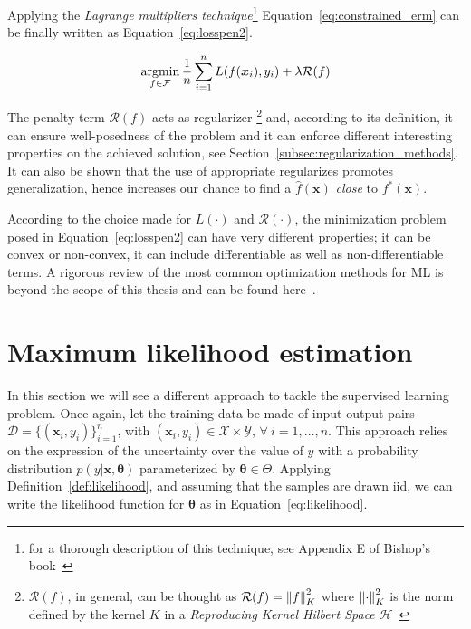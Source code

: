 Applying the \textit{Lagrange multipliers technique}\footnote{for a thorough description of this technique, see Appendix E of Bishop's book~\cite{bishop2006pattern}} Equation~\eqref{eq:constrained_erm} can be finally written as Equation~\eqref{eq:losspen2}.

\begin{equation} \label{eq:losspen2}
	\mathop{\mathrm{argmin}}\limits_{f \in \mathcal{F}}{\frac{1}{n} \sum_{i=1}^{n} L(f(\bm{x}_i), y_i)} + \lambda \mathcal{R}(f)
\end{equation}

The penalty term $\mathcal{R}(f)$ acts as regularizer \footnote{$\mathcal{R}(f)$, in general, can be thought as $\mathcal{R}(f) = \left\lVert f\right\rVert^2_K$ where $\left\lVert\cdot\right\rVert^2_K$ is the norm defined by the kernel $K$ in a \textit{Reproducing Kernel Hilbert Space} $\mathcal{H}$~\cite{evgeniou2000regularization}}
and, according to its definition, it can ensure well-posedness of the problem and it can enforce different interesting properties on the achieved solution, see Section~\ref{subsec:regularization_methods}. It can also be shown that the use of appropriate regularizes promotes generalization, hence increases our chance to find a $\hat f(\bm{x})$ \textit{close} to $f^*(\bm{x})$.

 According to the choice made for $L(\cdot)$ and $\mathcal{R}(\cdot)$, the minimization problem posed in Equation~\eqref{eq:losspen2} can have very different properties; it can be convex or non-convex, it can include differentiable as well as non-differentiable terms. A rigorous review of the most common optimization methods for ML is beyond the scope of this thesis and can be found here~\cite{boyd2004convex, bach2012optimization, sra2012optimization, nesterov2013introductory}.


\section{Maximum likelihood  estimation} \label{sec:mle}
In this section we will see a different approach to tackle the supervised learning problem.
Once again, let the training data be made of input-output pairs $\mathcal{D} = \{(\bm{x}_i, y_i)\}_{i=1}^n$, with $(\bm{x}_i,y_i) \in \mathcal{X} \times \mathcal{Y}$, $\forall~i=1,\dots,n$. This approach relies on the expression of the uncertainty over the value of $y$ with a probability distribution $p(y|\bm{x},\bm{\theta})$ parameterized by $\bm{\theta} \in \Theta$.
Applying Definition~\ref{def:likelihood}, and assuming that the samples are drawn \ac{iid}, we can write the likelihood function for $\bm{\theta}$ as in Equation~\eqref{eq:likelihood}.

